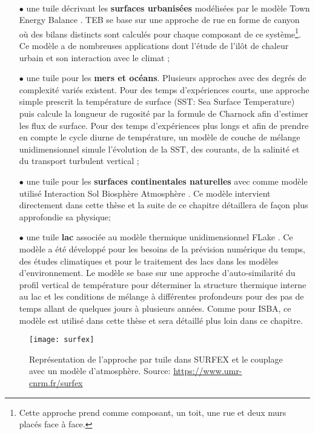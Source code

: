 ~\\

\begin{itemize}
\medbreak
\item[$\bullet$] une tuile décrivant les \textbf{surfaces urbanisées} modélisées par le modèle Town Energy Balance \citep[TEB,][]{masson2000,lemonsu2004}. TEB se base sur une approche de rue en forme de canyon où des bilans distincts sont calculés pour chaque composant de ce système\footnote{Cette approche prend comme composant, un toit, une rue et deux murs placés face à face.}. Ce modèle a de nombreuses applications dont l'étude de l'ilôt de chaleur urbain et son interaction avec le climat \citep{daniel2019}; 
\bigbreak
\item[$\bullet$] une tuile pour les \textbf{mers et océans}. Plusieurs approches avec des degrés de complexité variés existent. Pour des temps d'expériences courts, une approche simple prescrit la température de surface (SST: Sea Surface Temperature) puis calcule la longueur de rugosité par la formule de Charnock afin d'estimer les flux de surface. Pour des temps d'expériences plus longs et afin de prendre en compte le cycle diurne de température, un modèle de couche de mélange unidimensionnel simule l'évolution de la SST, des courants, de la salinité et du transport turbulent vertical \citep{lebeaupin2009};
\bigbreak
\item[$\bullet$] une tuile pour les \textbf{surfaces continentales naturelles} avec comme modèle utilisé Interaction Sol Biosphère Atmosphère \citep[ISBA,][]{noilhan1989}. Ce modèle intervient directement dans cette thèse et la suite de ce chapitre détaillera de façon plus approfondie sa physique;
\bigbreak
\item[$\bullet$] une tuile \textbf{lac} associée au modèle thermique unidimensionnel FLake \citep{mironov2008}. Ce modèle a été développé pour les besoins de la prévision numérique du temps, des études climatiques et pour le traitement des lacs dans les modèles d'environnement. Le modèle se base sur une approche d'auto-similarité du profil vertical de température pour déterminer la structure thermique interne au lac et les conditions de mélange à différentes profondeurs pour des pas de temps allant de quelques jours à plusieurs années. Comme pour ISBA, ce modèle est utilisé dans cette thèse et sera détaillé plus loin dans ce chapitre. \\
\end{itemize}

\begin{figure}[h!]
  \centering
  \texttt{[image: surfex]}
  \caption{Représentation de l'approche par tuile dans SURFEX et le couplage avec un modèle d'atmosphère. Source: \url{https://www.umr-cnrm.fr/surfex}}
  \label{surfex}
\end{figure}

